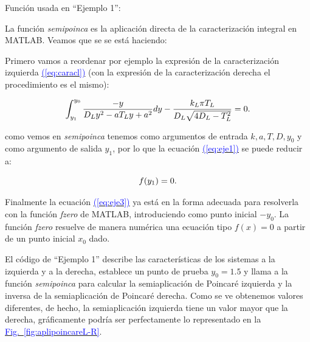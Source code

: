 \documentclass[12pt,a4paper]{report} %
\newcommand{\fref}[1]{\hyperref[#1]{\textcolor{blue}{Fig.~\ref*{#1}}}}
\newcommand{\eref}[1]{\hyperref[#1]{\textcolor{blue}{(\ref*{#1})}}}
\begin{document}
	\vspace{1cm}
	
	\vspace{1cm}
	
	\vspace{1cm}\noindent Función usada en ``Ejemplo 1'':
	\vspace{0.5cm}
	
	\newpage
	
	La función \textit{semipoinca} es la aplicación directa de la caracterización integral en MATLAB. Veamos que se se está haciendo:
	
	\vspace{0.5cm}\noindent Primero vamos a reordenar por ejemplo la expresión de la caracterización izquierda \eref{eq:caracl} (con la expresión de la caracterización derecha el procedimiento es el mismo):
	
	\begin{equation}
			\label{eq:eje1}
		\scalebox{1}{$\displaystyle
		\begin{gathered}
			\int_{y_1}^{y_0}\frac{-y}{D_Ly^2-aT_Ly+a^2}dy-\frac{k_L\pi T_L}{D_L\sqrt{4D_L-T_L^2}}=0.
		\end{gathered}
			$}
	\end{equation}\smallskip
	
	\noindent como vemos en \textit{semipoinca} tenemos como argumentos de entrada $k,a,T,D,y_0$ y como argumento de salida $y_1$, por lo que la ecuación \eref{eq:eje1} se puede reducir a:
	
		\begin{equation}
		\label{eq:eje3}
		\scalebox{1}{$\displaystyle
				f(y_1)=0.
			$}
	\end{equation}\smallskip
	
	\noindent Finalmente la ecuación \eref{eq:eje3} ya está en la forma adecuada para resolverla con la función \textit{fzero} de MATLAB, introduciendo como punto inicial $-y_0$. La función \textit{fzero} resuelve de manera numérica una ecuación tipo $f(x)=0$ a partir de un punto inicial $x_0$ dado.
	
	\vspace{0.5cm}\noindent El código de ``Ejemplo 1'' describe las características de los sistemas a la izquierda y a la derecha, establece un punto de prueba $y_0=1.5$ y llama a la función \textit{semipoinca} para calcular la semiaplicación de Poincaré izquierda y la inversa de la semiaplicación de Poincaré derecha. Como se ve obtenemos valores diferentes, de hecho, la semiaplicación izquierda tiene un valor mayor que la derecha, gráficamente podría ser perfectamente lo representado en la \fref{fig:aplipoincareL-R}.
	\newpage
	
\end{document}
